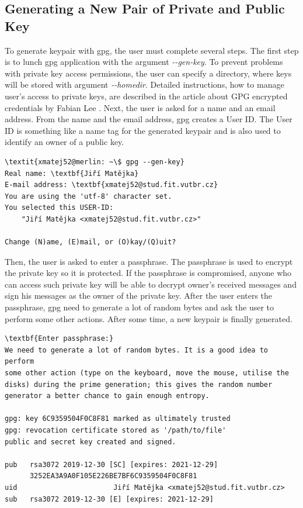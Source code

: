 \subsection*{Generating a New Pair of Private and Public Key}
To generate keypair with gpg, the user must complete several steps. The first step is to lunch gpg application with the argument {\textit{-{}-gen-key}}. To prevent problems with private key access permissions, the user can specify a directory, where keys will be stored with argument {\textit{-{}-homedir}}. Detailed instructions, how to manage user's access to private keys, are described in the article about GPG encrypted credentials by Fabian Lee \cite{gpgAccess}.  Next, the user is asked for a name and an email address. From the name and the email address, gpg creates a User ID. The User ID is something like a name tag for the generated keypair and is also used to identify an owner of a public key.
\begin{Verbatim}[commandchars=\\\{\},codes={\catcode`$=3\catcode`_=8},samepage=false,frame=single]
\textit{xmatej52@merlin: ~\$ gpg --gen-key}
Real name: \textbf{Jiří Matějka}
E-mail address: \textbf{xmatej52@stud.fit.vutbr.cz}
You are using the 'utf-8' character set.
You selected this USER-ID:
    "Jiří Matějka <xmatej52@stud.fit.vutbr.cz>"

Change (N)ame, (E)mail, or (O)kay/(Q)uit?
\end{Verbatim}

Then, the user is asked to enter a passphrase. The passphrase is used to encrypt the private key so it is protected. If the passphrase is compromised, anyone who can access such private key will be able to decrypt owner's received messages and sign his messages as the owner of the private key. After the user enters the passphrase, gpg need to generate a lot of random bytes and ask the user to perform some other actions. After some time, a new keypair is finally generated.
\begin{Verbatim}[commandchars=\\\{\},codes={\catcode`$=3\catcode`_=8},samepage=false,frame=single]
\textbf{Enter passphrase:}
We need to generate a lot of random bytes. It is a good idea to perform
some other action (type on the keyboard, move the mouse, utilise the
disks) during the prime generation; this gives the random number
generator a better chance to gain enough entropy.

gpg: key 6C9359504F0C8F81 marked as ultimately trusted
gpg: revocation certificate stored as '/path/to/file'
public and secret key created and signed.

pub   rsa3072 2019-12-30 [SC] [expires: 2021-12-29]
      3252EA3A9A0F105E226BE7BF6C9359504F0C8F81
uid                       Jiří Matějka <xmatej52@stud.fit.vutbr.cz>
sub   rsa3072 2019-12-30 [E] [expires: 2021-12-29]
\end{Verbatim}

